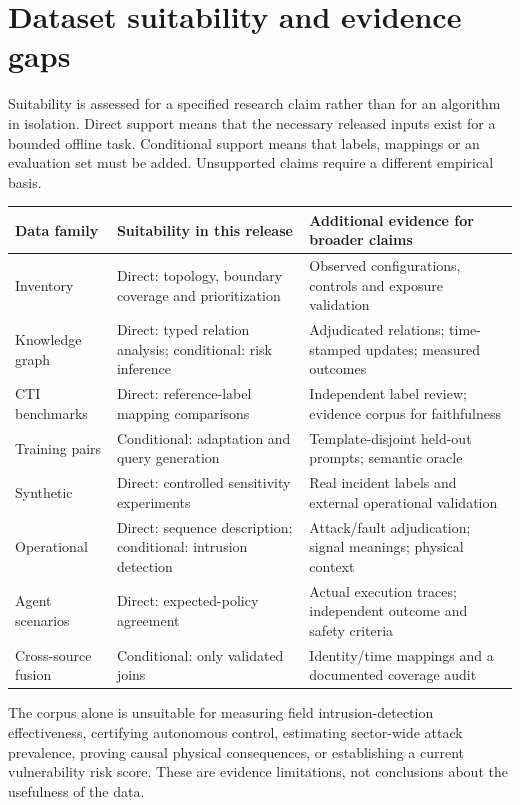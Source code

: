 \clearpage\section{Dataset suitability and evidence gaps}
Suitability is assessed for a specified research claim rather than for an algorithm in isolation. Direct support means that the necessary released inputs exist for a bounded offline task. Conditional support means that labels, mappings or an evaluation set must be added. Unsupported claims require a different empirical basis.

\begingroup\small\setlength{\tabcolsep}{5pt}\renewcommand{\arraystretch}{1.22}
\begin{tabularx}{\linewidth}{>{\raggedright\arraybackslash}X>{\raggedright\arraybackslash}X>{\raggedright\arraybackslash}X}
\toprule
\textbf{Data family} & \textbf{Suitability in this release} & \textbf{Additional evidence for broader claims}\\
\midrule
Inventory & Direct: topology, boundary coverage and prioritization & Observed configurations, controls and exposure validation\\
Knowledge graph & Direct: typed relation analysis; conditional: risk inference & Adjudicated relations; time-stamped updates; measured outcomes\\
CTI benchmarks & Direct: reference-label mapping comparisons & Independent label review; evidence corpus for faithfulness\\
Training pairs & Conditional: adaptation and query generation & Template-disjoint held-out prompts; semantic oracle\\
Synthetic & Direct: controlled sensitivity experiments & Real incident labels and external operational validation\\
Operational & Direct: sequence description; conditional: intrusion detection & Attack/fault adjudication; signal meanings; physical context\\
Agent scenarios & Direct: expected-policy agreement & Actual execution traces; independent outcome and safety criteria\\
Cross-source fusion & Conditional: only validated joins & Identity/time mappings and a documented coverage audit\\
\bottomrule\end{tabularx}\endgroup\par\medskip
The corpus alone is unsuitable for measuring field intrusion-detection effectiveness, certifying autonomous control, estimating sector-wide attack prevalence, proving causal physical consequences, or establishing a current vulnerability risk score. These are evidence limitations, not conclusions about the usefulness of the data.

